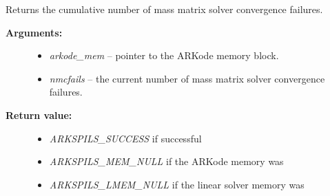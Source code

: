\documentclass[letterpaper,10pt,english]{sphinxmanual}
\begin{document}
\begin{fulllineitems}
\label{c_interface/User_callable:ARKSpilsGetNumMassConvFails}
Returns the cumulative number of mass matrix solver convergence failures.
\begin{description}
\item[{\textbf{Arguments:}}] \leavevmode\begin{itemize}
\item {} 
\emph{arkode\_mem} -- pointer to the ARKode memory block.

\item {} 
\emph{nmcfails} -- the current number of mass matrix solver convergence failures.

\end{itemize}

\item[{\textbf{Return value:}}] \leavevmode\begin{itemize}
\item {} 
\emph{ARKSPILS\_SUCCESS} if successful

\item {} 
\emph{ARKSPILS\_MEM\_NULL} if the ARKode memory was 

\item {} 
\emph{ARKSPILS\_LMEM\_NULL} if the linear solver memory was 

\end{itemize}

\end{description}

\end{fulllineitems}

\end{document}
